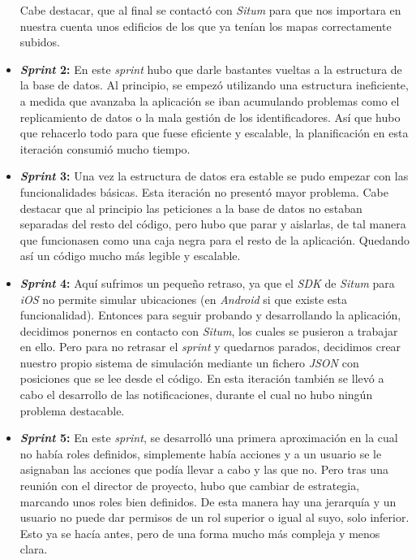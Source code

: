\begin{itemize}
Cabe destacar, que al final se contactó con \textit{Situm} para que nos importara en nuestra cuenta unos edificios de los que ya tenían los mapas correctamente subidos.
\item \textbf{\textit{Sprint} 2:} En este \textit{sprint} hubo que darle bastantes vueltas a la estructura de la base de datos. Al principio, se empezó utilizando una estructura ineficiente, a medida que avanzaba la aplicación se iban acumulando problemas como el replicamiento de datos o la mala gestión de los identificadores. Así que hubo que rehacerlo todo para que fuese eficiente y escalable, la planificación en esta iteración consumió mucho tiempo.
\item \textbf{\textit{Sprint} 3:} Una vez la estructura de datos era estable se pudo empezar con las funcionalidades básicas. Esta iteración no presentó mayor problema. Cabe destacar que al principio las peticiones a la base de datos no estaban separadas del resto del código, pero hubo que parar y aislarlas, de tal manera que funcionasen como una caja negra para el resto de la aplicación. Quedando así un código mucho más legible y escalable.
\item \textbf{\textit{Sprint} 4:} Aquí sufrimos un pequeño retraso, ya que el \textit{SDK} de \textit{Situm} para \textit{iOS} no permite simular ubicaciones (en \textit{Android} si que existe esta funcionalidad). Entonces para seguir probando y desarrollando la aplicación, decidimos ponernos en contacto con \textit{Situm}, los cuales se pusieron a trabajar en ello. Pero para no retrasar el \textit{sprint} y quedarnos parados, decidimos crear nuestro propio sistema de simulación mediante un fichero \textit{JSON} con posiciones que se lee desde el código. En esta iteración también se llevó a cabo el desarrollo de las notificaciones, durante el cual no hubo ningún problema destacable.
\item \textbf{\textit{Sprint} 5:} En este \textit{sprint}, se desarrolló una primera aproximación en la cual no había roles definidos, simplemente había acciones y a un usuario se le asignaban las acciones que podía llevar a cabo y las que no. Pero tras una reunión con el director de proyecto, hubo que cambiar de estrategia, marcando unos roles bien definidos. De esta manera hay una jerarquía y un usuario no puede dar permisos de un rol superior o igual al suyo, solo inferior. Esto ya se hacía antes, pero de una forma mucho más compleja y menos clara.


\end{itemize}
